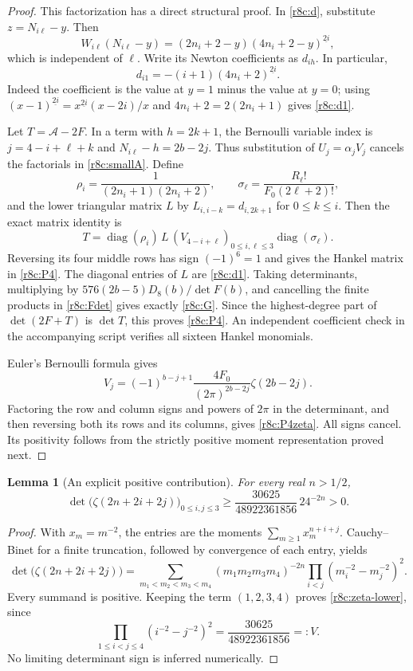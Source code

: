 \documentclass[11pt,a4paper]{article}
\numberwithin{equation}{section}
\theoremstyle{plain}
\newtheorem{lemma}[theorem]{Lemma}
\theoremstyle{definition}
\theoremstyle{remark}
\begin{document}
\begin{proof}
This factorization has a direct structural proof. In
\eqref{r8c:d}, substitute $z=N_{i\ell}-y$. Then
\[
 W_{i\ell}(N_{i\ell}-y)
    =(2n_i+2-y)(4n_i+2-y)^{\underline{2i}},
\]
which is independent of $\ell$. Write its Newton coefficients as
$d_{ih}$. In particular,
\begin{equation}\label{r8c:d1}
 d_{i1}=-(i+1)(4n_i+2)^{\underline{2i}}.
\end{equation}
Indeed the coefficient is the value at $y=1$ minus the value at
$y=0$; using
$(x-1)^{\underline{2i}}=x^{\underline{2i}}(x-2i)/x$
and $4n_i+2=2(2n_i+1)$ gives \eqref{r8c:d1}.

Let $T=\mathcal A-2F$. In a term with $h=2k+1$, the Bernoulli
variable index is $j=4-i+\ell+k$ and
$N_{i\ell}-h=2b-2j$. Thus substitution of $U_j=\alpha_jV_j$
cancels the factorials in \eqref{r8c:smallA}. Define
\[
 \rho_i=\frac1{(2n_i+1)(2n_i+2)},\qquad
 \sigma_\ell=\frac{R_\ell!}{F_0(2\ell+2)!},
\]
and the lower triangular matrix $L$ by
$L_{i,i-k}=d_{i,2k+1}$ for $0\le k\le i$.
Then the exact matrix identity is
\[
 T=\operatorname{diag}(\rho_i)\,L\,
       (V_{4-i+\ell})_{0\le i,\ell\le3}
       \operatorname{diag}(\sigma_\ell).
\]
Reversing its four middle rows has sign $(-1)^6=1$ and gives
the Hankel matrix in \eqref{r8c:P4}. The diagonal entries of $L$
are \eqref{r8c:d1}. Taking determinants, multiplying by
$576(2b-5)D_8(b)/\det F(b)$, and cancelling the finite products
in \eqref{r8c:Fdet} gives exactly \eqref{r8c:G}.
Since the highest-degree part of $\det(2F+T)$ is $\det T$,
this proves \eqref{r8c:P4}. An independent coefficient check in the
accompanying script verifies all sixteen Hankel monomials.

Euler's Bernoulli formula \cite[Eq. 24.8.1]{DLMF} gives
\[
 V_j=(-1)^{b-j+1}\frac{4F_0}{(2\pi)^{2b-2j}}
                     \zeta(2b-2j).
\]
Factoring the row and column signs and powers of $2\pi$ in the
determinant, and then reversing both its rows and its columns,
gives \eqref{r8c:P4zeta}. All signs cancel. Its positivity follows
from the strictly positive moment representation proved next.
\end{proof}

\begin{lemma}[An explicit positive contribution]\label{r8c:positive}
For every real $n>1/2$,
\begin{equation}\label{r8c:zeta-lower}
 \det\bigl(\zeta(2n+2i+2j)\bigr)_{0\le i,j\le3}
 \ge \frac{30625}{48922361856}\,24^{-2n}>0.
\end{equation}
\end{lemma}
\begin{proof}
With $x_m=m^{-2}$, the entries are the moments
$\sum_{m\ge1}x_m^{n+i+j}$. Cauchy--Binet for a finite truncation,
followed by convergence of each entry, yields
\[
 \det\bigl(\zeta(2n+2i+2j)\bigr)
 =\sum_{m_1<m_2<m_3<m_4}
   (m_1m_2m_3m_4)^{-2n}
   \prod_{i<j}(m_i^{-2}-m_j^{-2})^2.
\]
Every summand is positive. Keeping the term $(1,2,3,4)$ proves
\eqref{r8c:zeta-lower}, since
\[
 \prod_{1\le i<j\le4}(i^{-2}-j^{-2})^2
       =\frac{30625}{48922361856}=:V.
\]
No limiting determinant sign is inferred numerically.
\end{proof}
\end{document}

